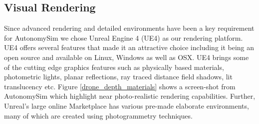 \documentclass[graybox]{svmult}
\begin{document}
	\subsection{Visual Rendering}
	
	Since advanced rendering and detailed environments have been a key requirement for AutonomySim we chose Unreal Engine 4 (UE4) \cite{karis2013real} as our rendering platform. UE4 offers several features that made it an attractive choice including it being an open source and available on Linux, Windows as well as OSX. UE4 brings some of the cutting edge graphics features such as physically based materials, photometric lights, planar reflections, ray traced distance field shadows, lit translucency etc. Figure \ref{drone_depth_materials} shows a screen-shot from AutonomySim which highlight near photo-realistic rendering capabilities. Further, Unreal's large online Marketplace has various pre-made elaborate environments, many of which are created using photogrammetry techniques.
	
	
\end{document}
